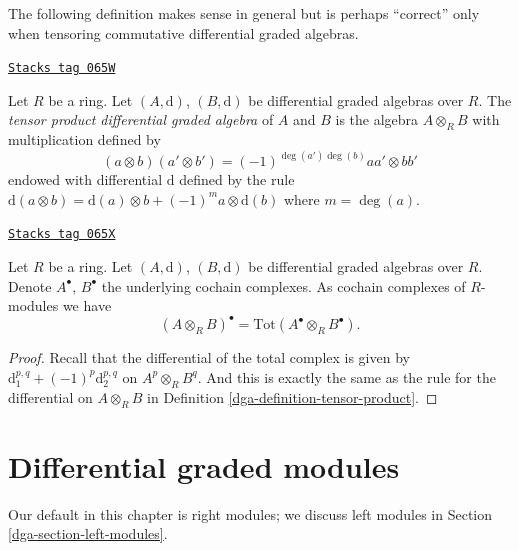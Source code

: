 The following definition makes sense in general but is perhaps
``correct'' only when tensoring commutative differential graded
algebras.

\begin{definition}
\label{dga-definition-tensor-product}
\href{https://stacks.math.columbia.edu/tag/065W}{\texttt{Stacks tag 065W}}

Let $R$ be a ring.
Let $(A, \text{d})$, $(B, \text{d})$ be differential graded algebras over $R$.
The {\it tensor product differential graded algebra} of $A$ and $B$
is the algebra $A \otimes_R B$ with multiplication defined by
$$
(a \otimes b)(a' \otimes b') = (-1)^{\deg(a')\deg(b)} aa' \otimes bb'
$$
endowed with differential $\text{d}$ defined by the rule
$\text{d}(a \otimes b) = \text{d}(a) \otimes b + (-1)^m a \otimes \text{d}(b)$
where $m = \deg(a)$.
\end{definition}

\begin{lemma}
\label{dga-lemma-total-complex-tensor-product}
\href{https://stacks.math.columbia.edu/tag/065X}{\texttt{Stacks tag 065X}}

Let $R$ be a ring.
Let $(A, \text{d})$, $(B, \text{d})$ be differential graded algebras over $R$.
Denote $A^\bullet$, $B^\bullet$ the underlying cochain complexes.
As cochain complexes of $R$-modules we have
$$
(A \otimes_R B)^\bullet = \text{Tot}(A^\bullet \otimes_R B^\bullet).
$$
\end{lemma}

\begin{proof}

Recall that the differential of the total complex is given by
$\text{d}_1^{p, q} + (-1)^p \text{d}_2^{p, q}$ on $A^p \otimes_R B^q$.
And this is exactly the same as the rule for the differential
on $A \otimes_R B$ in
Definition \ref{dga-definition-tensor-product}.
\end{proof}

\section{Differential graded modules}
\label{dga-section-modules}
Our default in this chapter is right modules;
we discuss left modules in Section \ref{dga-section-left-modules}.

